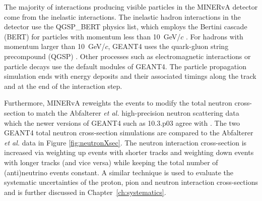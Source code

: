 
The majority of interactions producing visible particles in the MINERvA detector come from the inelastic interactions. The inelastic hadron interactions in the detector use the QGSP\_BERT physics list, which employs the Bertini cascade (BERT) \cite{Bertini1963_PhysRev.131.1801,Guthrie:1968ue, Bertini1969_PhysRev.188.1711,BERTINI1971670} for particles with momentum less than \mbox{10 GeV/$c$} \cite{BertiniGeant4_heikkinen2003bertini}. For hadrons with momentum larger than \mbox{10 GeV/$c$}, GEANT4 uses the quark-gluon string precompound (QGSP) \cite{QGSP_folger2003string}. Other processes such as electromagnetic interactions or particle decays use the default modules of GEANT4. The particle propagation simulation ends with energy deposits and their associated timings along the track and at the end of the interaction step.


Furthermore, MINERvA reweights the events to modify the total neutron cross-section to match the Abfalterer \textit{et al.} \cite{Abfalterer_PhysRevC.63.044608} high-precision neutron scattering data which the newer versions of GEANT4 such as 10.3.p03 agree with \cite{Elkins2019_PhysRevD.100.052002}. The two GEANT4 total neutron cross-section simulations are compared to the Abfalterer \textit{et al.} data in Figure \ref{fig:neutronXsec}. The neutron interaction cross-section is increased via weighting up events with shorter tracks and weighting down events with longer tracks (and vice versa) while keeping the total number of (anti)neutrino events constant. A similar technique is used to evaluate the systematic uncertainties of the proton, pion and neutron interaction cross-sections and is further discussed in Chapter~\ref{ch:systematics}.



